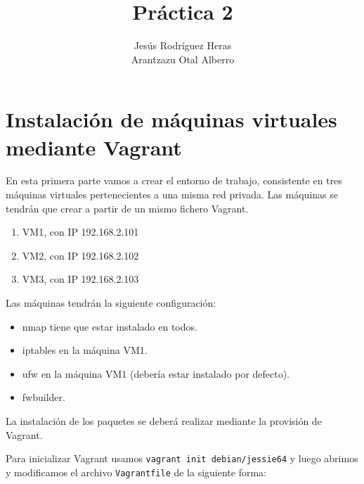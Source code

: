 \documentclass[12pt,letterpaper]{article}
\title{Práctica 2}
\author{Jesús Rodríguez Heras\\
	Arantzazu Otal Alberro}
\begin{document}
	
	\maketitle
%			
	\thispagestyle{empty}
	\newpage
	
	
	
	
	
	\lstset{language=bash, numbers=left, numberstyle=\tiny, numbersep=10pt, firstnumber=1, stepnumber=1, basicstyle=\small\ttfamily, tabsize=1, extendedchars=true, inputencoding=utf8/latin1, breaklines=true}
	
\section{Instalación de máquinas virtuales mediante Vagrant}
En esta primera parte vamos a crear el entorno de trabajo, consistente en tres máquinas virtuales pertenecientes a una misma red privada. Las máquinas se tendrán que crear a partir de un mismo fichero Vagrant.
\begin{enumerate}
	\item VM1, con IP 192.168.2.101
	\item VM2, con IP 192.168.2.102
	\item VM3, con IP 192.168.2.103
\end{enumerate}

Las máquinas tendrán la siguiente configuración:
\begin{itemize}
	\item nmap tiene que estar instalado en todos.
	\item iptables en la máquina VM1.
	\item ufw en la máquina VM1 (debería estar instalado por defecto).
	\item fwbuilder.
\end{itemize}

La instalación de los paquetes se deberá realizar mediante la provisión de Vagrant.

Para inicializar Vagrant usamos \texttt{vagrant init debian/jessie64} y luego abrimos y modificamos el archivo \texttt{Vagrantfile} de la siguiente forma:

\end{document}
